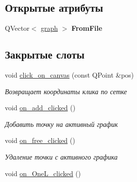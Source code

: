 \subsection*{Открытые атрибуты}
\begin{DoxyCompactItemize}
\item 
Q\+Vector$<$ \hyperlink{classgraph}{graph} $>$ {\bfseries From\+File}\hypertarget{class_main_window_a2c787b8ddb65b81709834176d660743c}{}\label{class_main_window_a2c787b8ddb65b81709834176d660743c}

\end{DoxyCompactItemize}
\subsection*{Закрытые слоты}
\begin{DoxyCompactItemize}
\item 
void \hyperlink{class_main_window_aa518cb3e5c52da2ccb6b886d6e09339d}{click\+\_\+on\+\_\+canvas} (const Q\+Point \&pos)\hypertarget{class_main_window_aa518cb3e5c52da2ccb6b886d6e09339d}{}\label{class_main_window_aa518cb3e5c52da2ccb6b886d6e09339d}

\begin{DoxyCompactList}\small\item\em Возвращает координаты клика по сетке \end{DoxyCompactList}\item 
void \hyperlink{class_main_window_ac5d7fe3c822551a9525b83fb6b3b99d3}{on\+\_\+add\+\_\+clicked} ()\hypertarget{class_main_window_ac5d7fe3c822551a9525b83fb6b3b99d3}{}\label{class_main_window_ac5d7fe3c822551a9525b83fb6b3b99d3}

\begin{DoxyCompactList}\small\item\em Добавить точку на активный график \end{DoxyCompactList}\item 
void \hyperlink{class_main_window_ad7f5879e59277f275c452d99d2d1e923}{on\+\_\+free\+\_\+clicked} ()\hypertarget{class_main_window_ad7f5879e59277f275c452d99d2d1e923}{}\label{class_main_window_ad7f5879e59277f275c452d99d2d1e923}

\begin{DoxyCompactList}\small\item\em Удаление точки с активного графика \end{DoxyCompactList}\item 
void \hyperlink{class_main_window_ac1cc49b084dceb4e44b973819b8bc9cc}{on\+\_\+\+One\+L\+\_\+clicked} ()\hypertarget{class_main_window_ac1cc49b084dceb4e44b973819b8bc9cc}{}\label{class_main_window_ac1cc49b084dceb4e44b973819b8bc9cc}


\end{DoxyCompactItemize}

